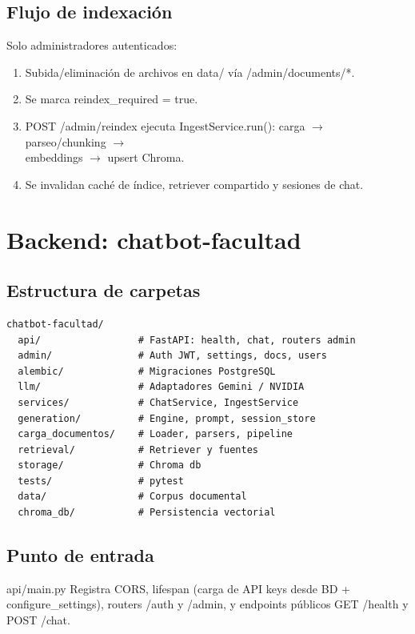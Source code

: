 \documentclass[11pt, a4paper, oneside]{report}
\begin{document}
\section{Flujo de indexación}
Solo administradores autenticados:

\begin{enumerate}
  \item Subida/eliminación de archivos en data/ vía /admin/documents/*.
  \item Se marca reindex\_required = true.
  \item POST /admin/reindex ejecuta IngestService.run():
        carga $\rightarrow$ parseo/chunking $\rightarrow$ \\embeddings $\rightarrow$ upsert Chroma.
  \item Se invalidan caché de índice, retriever compartido y sesiones de chat.
\end{enumerate}

\chapter{Backend: chatbot-facultad}

\section{Estructura de carpetas}
\begin{lstlisting}
chatbot-facultad/
  api/                 # FastAPI: health, chat, routers admin
  admin/               # Auth JWT, settings, docs, users
  alembic/             # Migraciones PostgreSQL
  llm/                 # Adaptadores Gemini / NVIDIA
  services/            # ChatService, IngestService
  generation/          # Engine, prompt, session_store
  carga_documentos/    # Loader, parsers, pipeline
  retrieval/           # Retriever y fuentes
  storage/             # Chroma db
  tests/               # pytest
  data/                # Corpus documental
  chroma_db/           # Persistencia vectorial
\end{lstlisting}

\section{Punto de entrada}
\begin{archibox}{api/main.py}
Registra CORS, lifespan (carga de API keys desde BD + {configure\_settings}),
routers {/auth} y {/admin}, y endpoints públicos
{GET /health} y {POST /chat}.
\end{archibox}
\end{document}
